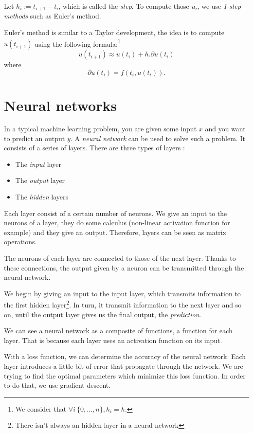\documentclass[10pt,a4paper]{article}
\theoremstyle{definition}
\theoremstyle{definition}
\begin{document}
Let $h_i := t_{i+1} - t_i$, which is called the \textit{step}. To compute those $u_i$, we use \textit{1-step methods} such as Euler's method.

Euler's method is similar to a Taylor development, the idea is to compute $u(t_{i+1})$ using the following formula:\footnote{We consider that $ \forall i\ \{0,...,n\}, h_i = h$.}
\[
u(t_{i+1}) \approx u(t_i) + h . \partial u(t_i)
\]
where 
\[
\partial u(t_i) = f(t_i, u(t_i)).
\]

\section{Neural networks}

In a typical machine learning problem, you are given some input $x$ and you want to predict an output $y$. A \textit{neural network} can be used to solve such a problem. It consists of a series of layers. There are three types of layers :

\begin{itemize}
\item The \textit{input} layer
\item The \textit{output} layer
\item The \textit{hidden} layers
\end{itemize}

Each layer consist of a certain number of neurons. We give an input to the neurons of a layer, they do some calculus (non-linear activation function for example) and they give an output. Therefore, layers can be seen as matrix operations. 

The neurons of each layer are connected to those of the next layer. Thanks to these connections, the output given by a neuron can be transmitted through the neural network. 

We begin by giving an input to the input layer, which transmits information to the first hidden layer\footnote{There isn't always an hidden layer in a neural network}. In turn, it transmit information to the next layer and so on, until the output layer gives us the final output, the \textit{prediction}. 

We can see a neural network as a composite of functions, a function for each layer. That is because each layer uses an activation function on its input. 

With a loss function, we can determine the accuracy of the neural network. Each layer introduces a little bit of error that propagate through the network. We are trying to find the optimal parameters which minimize this loss function. In order to do that, we use gradient descent.
\end{document}
